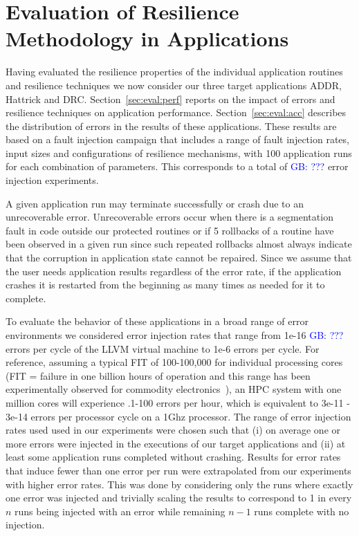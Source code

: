 \documentclass{sig-alternate}
\newcommand{\greg}[1]{%
  \textcolor{blue}{GB: #1}
}
\begin{document}
{\section{Evaluation of Resilience Methodology in Applications}
\label{sec:eval}

Having evaluated the resilience properties of the individual application routines and resilience techniques we now consider our three target applications ADDR, Hattrick and DRC.
Section~\ref{sec:eval:perf} reports on the impact of errors and resilience techniques on application performance. Section~\ref{sec:eval:acc} describes the distribution of errors in the results of these applications.
These results are based on a fault injection campaign that includes a range of fault injection rates, input sizes and configurations of resilience mechanisms, with 100 application runs for each combination of parameters.
This corresponds to a total of \greg{???} error injection experiments.

A given application run may terminate successfully or crash due to an unrecoverable error.
Unrecoverable errors occur when there is a segmentation fault in code outside our protected routines or if 5 rollbacks of a routine have been observed in a given run since such repeated rollbacks almost always indicate that the corruption in application state cannot be repaired.
Since we assume that the user needs application results regardless of the error rate, if the application crashes it is restarted from the beginning as many times as needed for it to complete.

To evaluate the behavior of these applications in a broad range of error environments we considered error injection rates that range from 1e-16 \greg{???} errors per cycle of the LLVM virtual machine to 1e-6 errors per cycle.
For reference, assuming a typical FIT of 100-100,000 for individual processing cores (FIT = failure in one billion hours of operation and this range has been experimentally observed for commodity electronics~\cite{mem_errors:2010, DRAMerr:2009}), an HPC system with one million cores will experience .1-100 errors per hour, which is equivalent to 3e-11 - 3e-14 errors per processor cycle on a 1Ghz processor.
The range of error injection rates used used in our experiments were chosen such that (i) on average one or more errors were injected in the executions of our target applications and (ii) at least some application runs completed without crashing.
Results for error rates that induce fewer than one error per run were extrapolated from our experiments with higher error rates.
This was done by considering only the runs where exactly one error was injected and trivially scaling the results to correspond to 1 in every $n$ runs being injected with an error while remaining $n-1$ runs complete with no injection.

}
\end{document}
